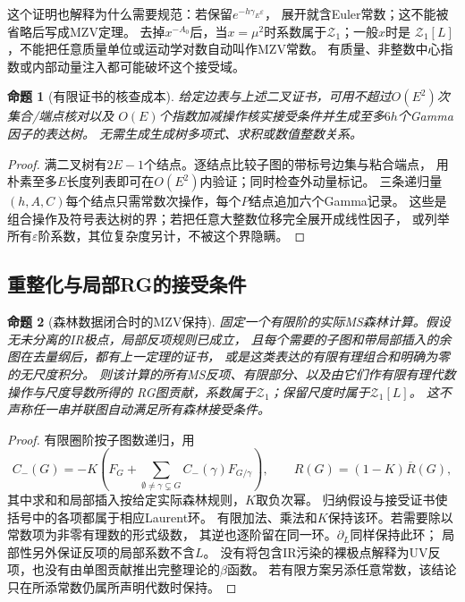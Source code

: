\documentclass[11pt,a4paper]{ctexart}
\theoremstyle{cnplain}\newtheorem{theorem}{定理}[section]
\newtheorem{proposition}[theorem]{命题}
\theoremstyle{definition}\newtheorem{definition}[theorem]{定义}
\theoremstyle{remark}\newtheorem{remark}[theorem]{注}
\begin{document}
这个证明也解释为什么需要规范：若保留$e^{-h\gamma_E\varepsilon}$，
展开就含Euler常数；这不能被省略后写成MZV定理。
去掉$x^{-A_0}$后，当$x=\mu^2$时系数属于$\mathcal Z_1$；一般$x$时是
$\mathcal Z_1[L]$，不能把任意质量单位或运动学对数自动叫作MZV常数。
有质量、非整数中心指数或内部动量注入都可能破坏这个接受域。

\begin{proposition}[有限证书的核查成本]\label{prop:masslesscertificate}
给定边表与上述二叉证书，可用不超过$O(E^2)$次集合/端点核对以及
$O(E)$个指数加减操作核实接受条件并生成至多$6h$个Gamma因子的表达树。
无需生成生成树多项式、求积或数值整数关系。
\end{proposition}
\begin{proof}
满二叉树有$2E-1$个结点。逐结点比较子图的带标号边集与粘合端点，
用朴素至多$E$长度列表即可在$O(E^2)$内验证；同时检查外动量标记。
三条递归量$(h,A,C)$每个结点只需常数次操作，每个$P$结点追加六个Gamma记录。
这些是组合操作及符号表达树的界；若把任意大整数位移完全展开成线性因子，
或列举所有$\varepsilon$阶系数，其位复杂度另计，不被这个界隐瞒。
\end{proof}

\subsection{重整化与局部RG的接受条件}
\begin{proposition}[森林数据闭合时的MZV保持]\label{prop:masslessforestclosure}
固定一个有限阶的实际MS森林计算。假设无未分离的IR极点，局部反项规则已成立，
且每个需要的子图和带局部插入的余图在去量纲后，都有上一定理的证书，
或是这类表达的有限有理组合和明确为零的无尺度积分。
则该计算的所有MS反项、有限部分、以及由它们作有限有理代数操作与尺度导数所得的
RG图贡献，系数属于$\mathcal Z_1$；保留尺度时属于$\mathcal Z_1[L]$。
这不声称任一串并联图自动满足所有森林接受条件。
\end{proposition}
\begin{proof}
有限圈阶按子图数递归，用
\[
 C_-(G)=-K\!\left(F_G+
 \sum_{\emptyset\ne\gamma\subsetneq G}C_-(\gamma)F_{G/\gamma}\right),
 \qquad R(G)=(1-K)\overline R(G),
\]
其中求和和局部插入按给定实际森林规则，$K$取负次幂。
归纳假设与接受证书使括号中的各项都属于相应Laurent环。
有限加法、乘法和$K$保持该环。若需要除以常数项为非零有理数的形式级数，
其逆也逐阶留在同一环。$\partial_L$同样保持此环；
局部性另外保证反项的局部系数不含$L$。
没有将包含IR污染的裸极点解释为UV反项，也没有由单图贡献推出完整理论的$\beta$函数。
若有限方案另添任意常数，该结论只在所添常数仍属所声明代数时保持。
\end{proof}
\end{document}

